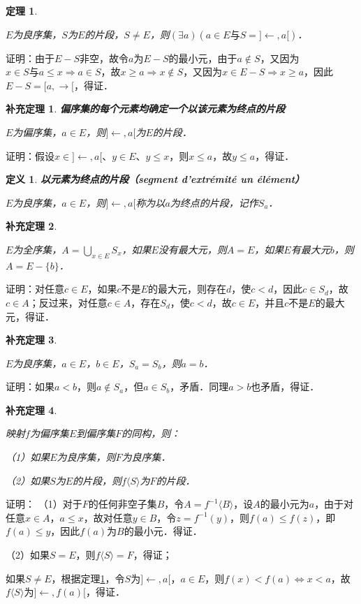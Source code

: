 \documentclass[12pt, a4paper, oneside]{book}
\newtheorem{theo}{定理}
\newtheorem{cor}{补充定理}
\newtheorem{de}{定义}
\begin{document}
			\begin{theo}\label{theo72}
				\hfill\par
				$E$为良序集，$S$为$E$的片段，$S\neq E$，则$(\exists a)(a\in E\text{与}S=]\gets, a[)$．
			\end{theo}
			证明：由于$E-S$非空，故令$a$为$E-S$的最小元，由于$a\notin S$，又因为$x\in S\text{与}a\leq x\Rightarrow a\in S$，故$x\geq a\Rightarrow x\notin S$，又因为$x\in E-S\Rightarrow x\geq a$，因此$E-S=[a, \to [$，得证．
			
			\begin{cor}\label{cor221}
				\textbf{偏序集的每个元素均确定一个以该元素为终点的片段}
				\par
				$E$为偏序集，$a\in E$，则$]\gets, a[$为$E$的片段．
			\end{cor}
			证明：假设$x\in ]\gets, a[$、$y\in E$、$y\leq x$，则$x\leq a$，故$y\leq a$，得证．
			
			\begin{de}
				\textbf{以元素为终点的片段（segment d'extrémité un élément）}
				\par
				$E$为良序集，$a\in E$，则$]\gets, a[$称为以$a$为终点的片段，记作$S_a$．
			\end{de}
			
			\begin{cor}\label{cor222}
				\hfill\par
				$E$为全序集，$A=\bigcup\limits_{x\in E}S_x$，如果$E$没有最大元，则$A=E$，如果$E$有最大元$b$，则$A=E-\{b\}$．
			\end{cor}
			证明：对任意$c\in E$，如果$c$不是$E$的最大元，则存在$d$，使$c<d$，因此$c\in S_d$，故$c\in A$；反过来，对任意$c\in A$，存在$S_d$，使$c<d$，故$c\in E$，并且$c$不是$E$的最大元，得证．
						
			\begin{cor}\label{cor223}
				\hfill\par
				$E$为良序集，$a\in E$，$b\in E$，$S_a=S_b$，则$a=b$．
			\end{cor}
			证明：如果$a<b$，则$a\notin S_a$，但$a\in S_b$，矛盾．同理$a>b$也矛盾，得证．
			
			\begin{cor}\label{cor224}
				\hfill\par
				映射$f$为偏序集$E$到偏序集$F$的同构，则：
				\par
				（1）如果$E$为良序集，则$F$为良序集．
				\par
				（2）如果$S$为$E$的片段，则$f\langle S\rangle$为$F$的片段．
			\end{cor}
			证明：
			（1）对于$F$的任何非空子集$B$，令$A=f^{-1}\langle B\rangle$，设$A$的最小元为$a$，由于对任意$x\in A$，$a\leq x$，故对任意$y\in B$，令$z=f^{-1}(y)$，则$f(a)\leq f(z)$，即$f(a)\leq y$，因此$f(a)$为$B$的最小元．得证．
			\par
			（2）如果$S=E$，则$f\langle S \rangle =F$，得证；
			\par
			如果$S\neq E$，根据定理\ref{theo72}，令$S$为$] \gets, a[$，$a\in E$，则$f(x)<f(a)\Leftrightarrow x<a$，故$f\langle S \rangle $为$] \gets, f(a)[$，得证．
			
\end{document}

